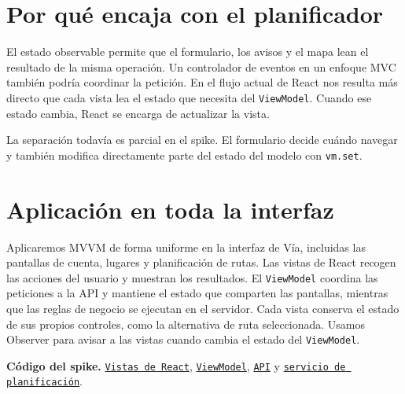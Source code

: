 \documentclass[10pt,a4paper]{article}
\newcommand{\spike}[2]{\href{https://github.com/Kiliansito/ei1039-ei1048-movilidad/blob/c170fd7/entrega1/02_Spike/#1}{\texttt{#2}}}
\begin{document}
\section*{Por qué encaja con el planificador}

El estado observable permite que el formulario, los avisos y el mapa lean el resultado de la misma operación. Un controlador de eventos en un enfoque MVC también podría coordinar la petición. En el flujo actual de React nos resulta más directo que cada vista lea el estado que necesita del \texttt{ViewModel}. Cuando ese estado cambia, React se encarga de actualizar la vista.

La separación todavía es parcial en el spike. El formulario decide cuándo navegar y también modifica directamente parte del estado del modelo con \texttt{vm.set}.

\section*{Aplicación en toda la interfaz}

Aplicaremos MVVM de forma uniforme en la interfaz de Vía, incluidas las pantallas de cuenta, lugares y planificación de rutas. Las vistas de React recogen las acciones del usuario y muestran los resultados. El \texttt{ViewModel} coordina las peticiones a la API y mantiene el estado que comparten las pantallas, mientras que las reglas de negocio se ejecutan en el servidor. Cada vista conserva el estado de sus propios controles, como la alternativa de ruta seleccionada. Usamos Observer para avisar a las vistas cuando cambia el estado del \texttt{ViewModel}.

\textbf{Código del spike.} \spike{web/main.tsx}{Vistas de React},
\spike{web/model.ts}{ViewModel},
\spike{src/http.ts}{API} y
\spike{src/services.ts}{servicio de planificación}.
\end{document}
